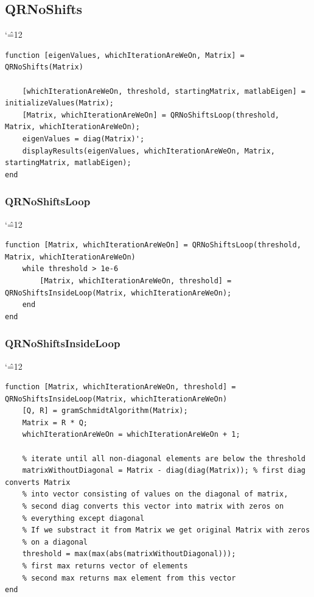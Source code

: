 \documentclass[12pt]{report}
\newenvironment{simplechar}{%
   \catcode`\^=12
}{}
\begin{document}
\subsection{QRNoShifts}
\begin{simplechar}
\begin{lstlisting}
function [eigenValues, whichIterationAreWeOn, Matrix] = QRNoShifts(Matrix)

    [whichIterationAreWeOn, threshold, startingMatrix, matlabEigen] = initializeValues(Matrix);
    [Matrix, whichIterationAreWeOn] = QRNoShiftsLoop(threshold, Matrix, whichIterationAreWeOn);
    eigenValues = diag(Matrix)';
    displayResults(eigenValues, whichIterationAreWeOn, Matrix, startingMatrix, matlabEigen);
end
\end{lstlisting}
\end{simplechar}

\newpage
\subsubsection{QRNoShiftsLoop}
\begin{simplechar}
\begin{lstlisting}
function [Matrix, whichIterationAreWeOn] = QRNoShiftsLoop(threshold, Matrix, whichIterationAreWeOn)
    while threshold > 1e-6
        [Matrix, whichIterationAreWeOn, threshold] = QRNoShiftsInsideLoop(Matrix, whichIterationAreWeOn);
    end
end
\end{lstlisting}
\end{simplechar}

\subsubsection{QRNoShiftsInsideLoop}
\begin{simplechar}
\begin{lstlisting}
function [Matrix, whichIterationAreWeOn, threshold] = QRNoShiftsInsideLoop(Matrix, whichIterationAreWeOn)
    [Q, R] = gramSchmidtAlgorithm(Matrix);
    Matrix = R * Q;
    whichIterationAreWeOn = whichIterationAreWeOn + 1;

    % iterate until all non-diagonal elements are below the threshold
    matrixWithoutDiagonal = Matrix - diag(diag(Matrix)); % first diag converts Matrix
    % into vector consisting of values on the diagonal of matrix,
    % second diag converts this vector into matrix with zeros on
    % everything except diagonal
    % If we substract it from Matrix we get original Matrix with zeros
    % on a diagonal
    threshold = max(max(abs(matrixWithoutDiagonal)));
    % first max returns vector of elements
    % second max returns max element from this vector
end
\end{lstlisting}
\end{simplechar}
\end{document}

